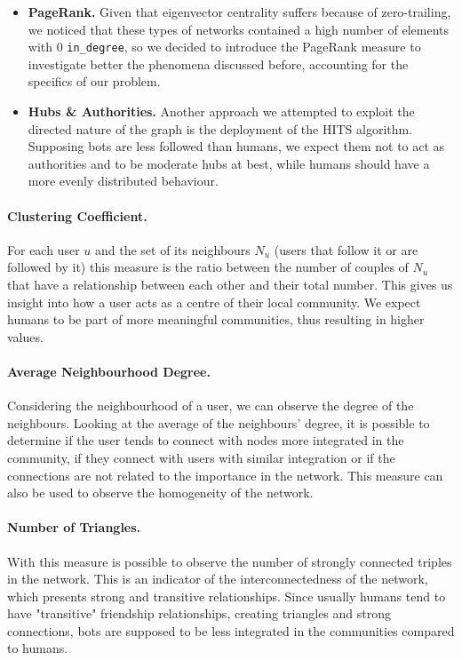 \documentclass[12pt, a4paper]{article}
\begin{document}
\begin{itemize}
			\item \textbf{PageRank.} Given that eigenvector centrality suffers because of zero-trailing, we noticed that these types of networks contained a high number of elements with 0 \texttt{in\_degree}, so we decided to introduce the PageRank measure to investigate better the phenomena discussed before, accounting for the specifics of our problem.
			\item \textbf{Hubs \& Authorities.} Another approach we attempted to exploit the directed nature of the graph is the deployment of the HITS algorithm. Supposing bots are less followed than humans, we expect them not to act as authorities and to be moderate hubs at best, while humans should have a more evenly distributed behaviour.
		\end{itemize}
		\paragraph{Clustering Coefficient.} For each user \(u\) and the set of its neighbours \(N_{u}\) (users that follow it or are followed by it) this measure is the ratio between the number of couples of \(N_{u}\) that have a relationship between each other and their total number. This gives us insight into how a user acts as a centre of their local community. We expect humans to be part of more meaningful communities, thus resulting in higher values.
		\paragraph{Average Neighbourhood Degree.} Considering the neighbourhood of a user, we can observe the degree of the neighbours. Looking at the average of the neighbours' degree, it is possible to determine if the user tends to connect with nodes more integrated in the community, if they connect with users with similar integration or if the connections are not related to the importance in the network. This measure can also be used to observe the homogeneity of the network.
        \paragraph{Number of Triangles.} With this measure is possible to observe the number of strongly connected triples in the network. This is an indicator of the interconnectedness of the network, which presents strong and transitive relationships. Since usually humans tend to have "transitive" friendship relationships, creating triangles and strong connections, bots are supposed to be less integrated in the communities compared to humans.
\end{document}
